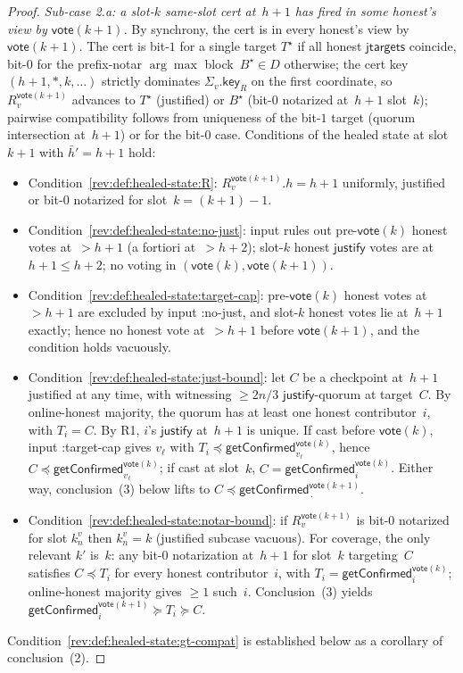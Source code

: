\documentclass{article}
\newcommand{\just}{\ensuremath{\mathsf{justify}}\xspace}
\newcommand{\jtargets}{\mathsf{jtargets}}
\newcommand{\key}{\mathsf{key}}
\newcommand{\vote}{\mathsf{vote}}
\newcommand{\comm}[1]{\bar{#1}}
\newcommand{\getConfirmed}{\textsf{getConfirmed}\xspace}
\theoremstyle{plain}
\theoremstyle{definition}
\theoremstyle{remark}
\newcommand{\OHM}{online-honest majority\xspace}
\begin{document}
\begin{proof}
\emph{Sub-case 2.a: a slot-$k$ same-slot cert at~$h+1$ has fired in some honest's view by $\vote(k+1)$.}
By synchrony, the cert is in every honest's view by $\vote(k+1)$. The cert is bit-$1$ for a single target $T^\star$ if all honest $\jtargets$ coincide, bit-$0$ for the prefix-notar $\arg\max$ block~$B^\star \in D$ otherwise; the cert key $(h+1, \ast, k, \ldots)$ strictly dominates $\Sigma_v.\key_R$ on the first coordinate, so $R_v^{\vote(k+1)}$ advances to $T^\star$ (justified) or $B^\star$ (bit-$0$ notarized at~$h+1$ slot~$k$); pairwise compatibility follows from uniqueness of the bit-$1$ target (quorum intersection at~$h+1$) or  for the bit-$0$ case. Conditions of the healed state at slot~$k+1$ with $\comm{h}' = h+1$ hold:
\begin{itemize}
  \item Condition~\ref{rev:def:healed-state:R}: $R_v^{\vote(k+1)}.h = h+1$ uniformly, justified or bit-$0$ notarized for slot~$k = (k+1)-1$.
  \item Condition~\ref{rev:def:healed-state:no-just}: input rules out pre-$\vote(k)$ honest votes at~$>h+1$ (a fortiori at~$>h+2$); slot-$k$ honest \just votes are at~$h+1 \leq h+2$; no voting in $(\vote(k),\vote(k+1))$.
  \item Condition~\ref{rev:def:healed-state:target-cap}: pre-$\vote(k)$ honest votes at~$>h+1$ are excluded by input :no-just, and slot-$k$ honest votes lie at~$h+1$ exactly; hence no honest vote at~$>h+1$ before $\vote(k+1)$, and the condition holds vacuously.
  \item Condition~\ref{rev:def:healed-state:just-bound}: let $C$ be a checkpoint at~$h+1$ justified at any time, with witnessing $\geq 2n/3$ \just-quorum at target~$C$. By \OHM, the quorum has at least one honest contributor~$i$, with $T_i = C$. By R1, $i$'s \just at~$h+1$ is unique. If cast before $\vote(k)$, input :target-cap gives $v_\ell$ with $T_i \preceq \getConfirmed_{v_\ell}^{\vote(k)}$, hence $C \preceq \getConfirmed_{v_\ell}^{\vote(k)}$; if cast at slot~$k$, $C = \getConfirmed_i^{\vote(k)}$. Either way, conclusion~(3) below lifts to $C \preceq \getConfirmed_{\,\cdot\,}^{\vote(k+1)}$.
  \item Condition~\ref{rev:def:healed-state:notar-bound}: if $R_v^{\vote(k+1)}$ is bit-$0$ notarized for slot $k_n^v$ then $k_n^v = k$ (justified subcase vacuous). For coverage, the only relevant $k'$ is~$k$: any bit-$0$ notarization at~$h+1$ for slot~$k$ targeting~$C$ satisfies $C \preceq T_i$ for every honest contributor~$i$, with $T_i = \getConfirmed_i^{\vote(k)}$; \OHM gives $\geq 1$ such~$i$. Conclusion~(3) yields $\getConfirmed_i^{\vote(k+1)} \succeq T_i \succeq C$.
\end{itemize}
Condition~\ref{rev:def:healed-state:gt-compat} is established below as a corollary of conclusion~(2).


\end{proof}
\end{document}
